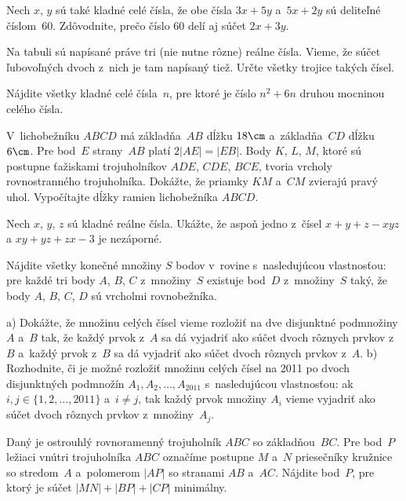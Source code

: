 {%
Nech $x$, $y$ sú také kladné celé čísla, že obe čísla $3x+5y$ a~$5x+2y$ sú deliteľné číslom~$60$. Zdôvodnite, prečo číslo $60$ delí aj súčet $2x+3y$.}

{%
Na tabuli sú napísané práve tri (nie nutne rôzne) reálne čísla. Vieme, že súčet ľubovoľných dvoch z~nich je tam napísaný tiež. Určte všetky trojice takých čísel.}

{%
Nájdite všetky kladné celé čísla~$n$, pre ktoré je číslo $n^2+6n$ druhou mocninou celého čísla.}

{%
V~lichobežníku $ABCD$ má základňa~$AB$ dĺžku $18\cm$ a~základňa~$CD$ dĺžku~$6\cm$. Pre bod~$E$ strany~$AB$ platí $2|AE|=|EB|$. Body $K$, $L$, $M$, ktoré sú postupne ťažiskami trojuholníkov $ADE$, $CDE$, $BCE$, tvoria vrcholy rovnostranného trojuholníka.
 Dokážte, že priamky $KM$ a~$CM$ zvierajú pravý uhol.
 Vypočítajte dĺžky ramien lichobežníka $ABCD$.}

{%
Nech $x$, $y$, $z$ sú kladné reálne čísla. Ukážte, že aspoň jedno z~čísel $x+y+z-xyz$ a ${xy+yz+zx-3}$ je nezáporné.}

{%
Nájdite všetky konečné množiny $S$ bodov v~rovine s~nasledujúcou vlastnosťou:
pre každé tri body $A$, $B$, $C$ z~množiny~$S$ existuje bod~$D$ z~množiny~$S$ taký, že body $A$, $B$, $C$, $D$ sú vrcholmi rovnobežníka.}

{%
a) Dokážte, že množinu celých čísel vieme rozložiť na dve disjunktné podmnožiny $A$ a~$B$ tak, že každý prvok z~$A$ sa dá vyjadriť ako súčet dvoch rôznych prvkov z~$B$ a~každý prvok z~$B$ sa dá vyjadriť ako súčet dvoch rôznych prvkov z~$A$.
b) Rozhodnite, či je možné rozložiť množinu celých čísel na 2011 po dvoch disjunktných podmnožín $A_1, A_2,\dots, A_{2011}$ s~nasledujúcou vlastnosťou:
ak $i, j\in\{1,2,\dots,2011\}$ a~$i\ne j$, tak každý prvok množiny $A_i$ vieme vyjadriť ako súčet dvoch rôznych prvkov z~množiny~$A_j$.
}

{%
Daný je ostrouhlý rovnoramenný trojuholník $ABC$ so základňou~$BC$.
Pre bod~$P$ ležiaci vnútri trojuholníka $ABC$ označíme postupne $M$ a~$N$
priesečníky kružnice so stredom~$A$ a~polomerom $|AP|$ so stranami $AB$ a~$AC$.
Nájdite bod~$P$, pre ktorý je súčet $|MN|+|BP|+|CP|$ minimálny.}


